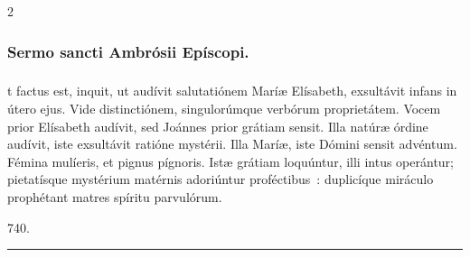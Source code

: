 \documentclass[9pt,twoside]{extarticle}
\begin{document}
\begin{multicols}{2}
\subsubsection*{\center {}}

\subsubsection*{\center Sermo sancti Ambrósii Epíscopi.}
\subsubsection*{\center {}}
t factus est, inquit, ut audívit salutatiónem Maríæ Elísabeth, exsultávit infans in útero ejus. Vide distinctiónem, singulorúmque verbórum proprietátem. Vocem prior Elísabeth audívit, sed Joánnes prior grátiam sensit. Illa natúræ órdine audívit, iste exsultávit ratióne mystérii. Illa Maríæ, iste Dómini sensit advéntum. Fémina mulíeris, et pignus pígnoris. Istæ grátiam loquúntur, illi intus operántur; pietatísque mystérium matérnis adoriúntur proféctibus~: duplicíque miráculo prophétant matres spíritu parvulórum.

\begin{tightlist}{}
\item {} 740.
\end{tightlist}

\begin{center}\textcolor{red}{\rule{\linewidth}{0.5pt}} \end{center}

\subsubsection*{\center {}}
\subsubsection*{\center {}}

\end{multicols}
\end{document}
